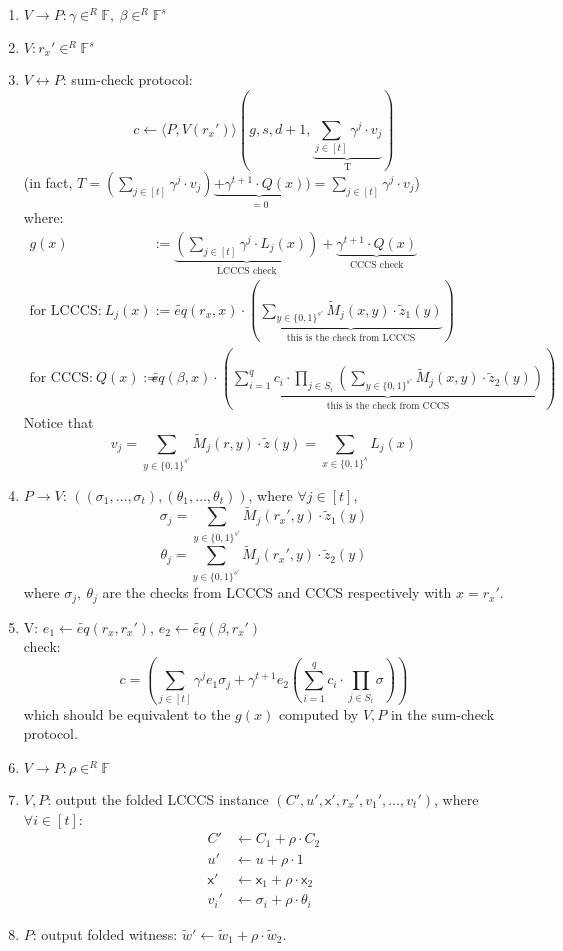 \documentclass{article}
\theoremstyle{definition}
\begin{document}
\begin{enumerate}
	\item $V \rightarrow P: \gamma \in^R \mathbb{F},~ \beta \in^R \mathbb{F}^s$
	\item $V: r_x' \in^R \mathbb{F}^s$
	\item $V \leftrightarrow P$: sum-check protocol:
		$$c \leftarrow \langle P, V(r_x') \rangle (g, s, d+1, \underbrace{\sum_{j \in [t]} \gamma^j \cdot v_j}_\text{T})$$
		(in fact, $T=(\sum_{j \in [t]} \gamma^j \cdot v_j) \underbrace{+ \gamma^{t+1} \cdot Q(x)}_{=0}) = \sum_{j \in [t]} \gamma^j \cdot v_j$)\\
		where:
		\begin{align*}
			g(x) &:= \underbrace{\left( \sum_{j \in [t]} \gamma^j \cdot L_j(x) \right)}_\text{LCCCS check} + \underbrace{\gamma^{t+1} \cdot Q(x)}_\text{CCCS check}\\
			\text{for LCCCS:}~ L_j(x) &:= \widetilde{eq}(r_x, x) \cdot \left(
				\underbrace{\sum_{y \in \{0,1\}^{s'}} \widetilde{M}_j(x, y) \cdot \widetilde{z}_1(y)}_\text{this is the check from LCCCS}
			\right)\\
				\text{for CCCS:}~ Q(x) := &\widetilde{eq}(\beta, x) \cdot \left(
				\underbrace{ \sum_{i=1}^q c_i \cdot \prod_{j \in S_i} \left( \sum_{y \in \{0, 1\}^{s'}} \widetilde{M}_j(x, y) \cdot \widetilde{z}_2(y) \right) }_\text{this is the check from CCCS}
			\right)
		\end{align*}
		Notice that
		$$v_j= \sum_{y\in \{0,1\}^{s'}} \widetilde{M}_j(r, y) \cdot \widetilde{z}(y) = \sum_{x\in \{0,1\}^s} L_j(x)$$
	\item $P \rightarrow V$: $\left( (\sigma_1, \ldots, \sigma_t), (\theta_1, \ldots, \theta_t) \right)$, where $\forall j \in [t]$,
		$$\sigma_j = \sum_{y \in \{0,1\}^{s'}} \widetilde{M}_j(r_x', y) \cdot \widetilde{z}_1(y)$$
		$$\theta_j = \sum_{y \in \{0, 1\}^{s'}} \widetilde{M}_j(r_x', y) \cdot \widetilde{z}_2(y)$$
		where $\sigma_j,~\theta_j$ are the checks from LCCCS and CCCS respectively with $x=r_x'$.
	\item V: $e_1 \leftarrow \widetilde{eq}(r_x, r_x')$, $e_2 \leftarrow \widetilde{eq}(\beta, r_x')$\\
		check:
		$$c = \left( \sum_{j \in [t]} \gamma^j e_1 \sigma_j + \gamma^{t+1} e_2 \left( \sum_{i=1}^q c_i \cdot \prod_{j \in S_i} \sigma \right) \right)$$
		which should be equivalent to the $g(x)$ computed by $V,P$ in the sum-check protocol.
	\item $V \rightarrow P: \rho \in^R \mathbb{F}$
	\item $V, P$: output the folded LCCCS instance $(C', u', \mathsf{x}', r_x', v_1', \ldots, v_t')$, where $\forall i \in [t]$:
		\begin{align*}
			C' &\leftarrow C_1 + \rho \cdot C_2\\
			u' &\leftarrow u + \rho \cdot 1\\
			\mathsf{x}' &\leftarrow \mathsf{x}_1 + \rho \cdot \mathsf{x}_2\\
			v_i' &\leftarrow \sigma_i + \rho \cdot \theta_i
		\end{align*}
	\item $P$: output folded witness: $\widetilde{w}' \leftarrow \widetilde{w}_1 + \rho \cdot \widetilde{w}_2$.
\end{enumerate}
\end{document}
